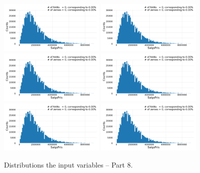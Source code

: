 \begin{figure}
  \subfloat{\qquad}
  \includegraphics[draft=false, width=0.45\textwidth, page=91, trim=15 0 15 0, clip]{figures/housing/overview_fig.pdf}\hfil
  \subfloat{\qquad}
  \includegraphics[draft=false, width=0.45\textwidth, page=92, trim=15 0 15 0, clip]{figures/housing/overview_fig.pdf}
  \subfloat{\qquad}
  \includegraphics[draft=false, width=0.45\textwidth, page=93, trim=15 0 15 0, clip]{figures/housing/overview_fig.pdf}\hfil
  \subfloat{\qquad}
  \includegraphics[draft=false, width=0.45\textwidth, page=94, trim=15 0 15 0, clip]{figures/housing/overview_fig.pdf}
  \subfloat{\qquad}
  \includegraphics[draft=false, width=0.45\textwidth, page=95, trim=15 0 15 0, clip]{figures/housing/overview_fig.pdf}\hfil
  \subfloat{\qquad}
  \includegraphics[draft=false, width=0.45\textwidth, page=96, trim=15 0 15 0, clip]{figures/housing/overview_fig.pdf}
  \caption[Distributions of the Input Variables -- Part 8]{Distributions the input variables -- Part 8.}
  \label{fig:h:variable_overview_all_8}
  \vspace{\abovecaptionskip}
\end{figure}

